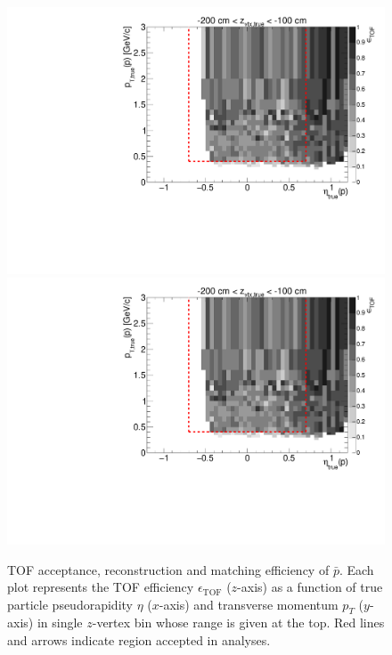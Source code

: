 \begin{figure}[hb]
\caption[TOF acceptance, reconstruction and matching efficiency of $\bar{p}$.]{TOF acceptance, reconstruction and matching efficiency of $\bar{p}$. Each plot represents the TOF efficiency $\epsilon_{\text{TOF}}$ ($z$-axis) as a function of true particle pseudorapidity $\eta$ ($x$-axis) and transverse momentum $p_{T}$ ($y$-axis) in single $z$-vertex bin whose range is given at the top. Red lines and arrows indicate region accepted in analyses.}\label{fig:tofEff_proton_minus}
\centering
\parbox{0.495\textwidth}{
  \centering
  \includegraphics[width=\linewidth,page=3]{graphics/eff/Eff2D_TOF_proton_Minus.pdf}\\
  \includegraphics[width=\linewidth,page=5]{graphics/eff/Eff2D_TOF_proton_Minus.pdf}\\
}
\end{figure}
